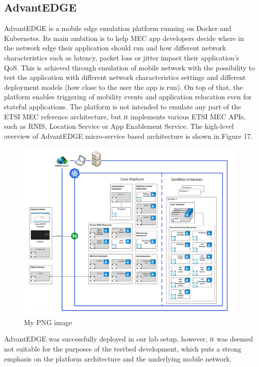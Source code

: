 \documentclass[12pt,a4paper,twoside]{report}
\begin{document}
\subsection{AdvantEDGE}
AdvantEDGE is a mobile edge emulation platform running on Docker and Kubernetes. Its main ambition is to help MEC app developers decide where in the network edge their application should run and how different network characteristics such as latency, packet loss or jitter impact their application’s QoS. This is achieved through emulation of mobile network with the possibility to test the application with different network characteristics settings and different deployment models (how close to the user the app is run). On top of that, the platform enables triggering of mobility events and application relocation even for stateful applications. The platform is not intended to emulate any part of the ETSI MEC reference architecture, but it implements various ETSI MEC APIs, such as RNIS, Location Service or App Enablement Service. The high-level overview of AdvantEDGE micro-service based architecture is shown in Figure 17.
\begin{figure}[ht]
	\centering
	\includegraphics[width=13cm]{./images/advatnedge.png} 
	\caption{My PNG image}
\end{figure}

AdvantEDGE was successfully deployed in our lab setup, however, it was deemed not suitable for the purposes of the testbed development, which puts a strong emphasis on the platform architecture and the underlying mobile network.

%

\end{document}
